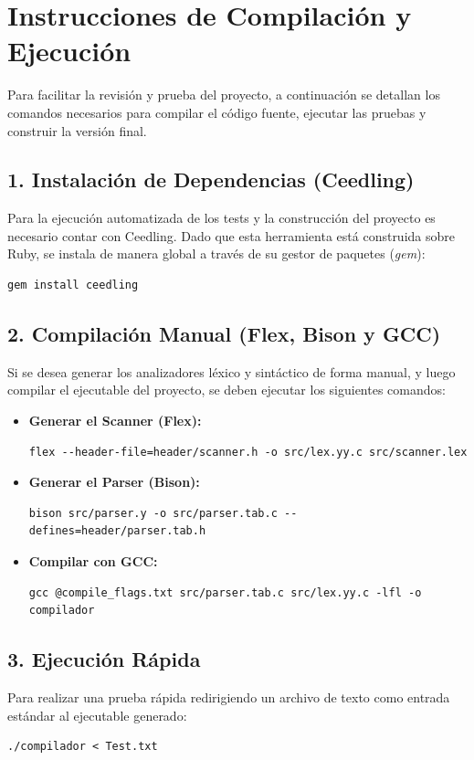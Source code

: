 \documentclass[11pt, a4paper]{article}
\begin{document}
\section{Instrucciones de Compilación y Ejecución}
Para facilitar la revisión y prueba del proyecto, a continuación se detallan los comandos necesarios para compilar el código fuente, ejecutar las pruebas y construir la versión final.

\subsection*{1. Instalación de Dependencias (Ceedling)}
Para la ejecución automatizada de los tests y la construcción del proyecto es necesario contar con Ceedling. Dado que esta herramienta está construida sobre Ruby, se instala de manera global a través de su gestor de paquetes (\textit{gem}):
\begin{verbatim}
gem install ceedling
\end{verbatim}

\subsection*{2. Compilación Manual (Flex, Bison y GCC)}
Si se desea generar los analizadores léxico y sintáctico de forma manual, y luego compilar el ejecutable del proyecto, se deben ejecutar los siguientes comandos:

\begin{itemize}
    \item \textbf{Generar el Scanner (Flex):}
\begin{verbatim}
flex --header-file=header/scanner.h -o src/lex.yy.c src/scanner.lex
\end{verbatim}

    \item \textbf{Generar el Parser (Bison):}
\begin{verbatim}
bison src/parser.y -o src/parser.tab.c --defines=header/parser.tab.h
\end{verbatim}

    \item \textbf{Compilar con GCC:}
\begin{verbatim}
gcc @compile_flags.txt src/parser.tab.c src/lex.yy.c -lfl -o compilador
\end{verbatim}
\end{itemize}

\subsection*{3. Ejecución Rápida}
Para realizar una prueba rápida redirigiendo un archivo de texto como entrada estándar al ejecutable generado:
\begin{verbatim}
./compilador < Test.txt
\end{verbatim}
\end{document}
